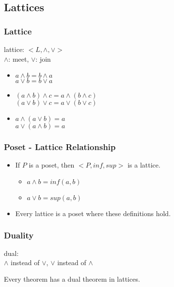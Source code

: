 \documentclass[dvipsnames]{beamer}
\begin{document}
\subsection{Lattices}

\begin{frame}
  \frametitle{Lattice}

  \begin{definition}
    \alert{lattice}: $<L,\wedge,\vee>$\\
    $\wedge$: meet, $\vee$: join

    \pause
    \begin{itemize}
      \item $a \wedge b = b \wedge a$\\
        $a \vee b = b \vee a$
      \item$(a \wedge b) \wedge c = a \wedge (b \wedge c)$\\
        $(a \vee b) \vee c = a \vee (b \vee c)$
      \item $a \wedge (a \vee b) = a$\\
        $a \vee (a \wedge b) = a$
    \end{itemize}
  \end{definition}
\end{frame}

\begin{frame}
  \frametitle{Poset - Lattice Relationship}

  \begin{itemize}
    \item If $P$ is a poset, then $<P,inf,sup>$ is a lattice.
    \begin{itemize}
      \item $a \wedge b = inf(a,b)$
      \item $a \vee b = sup(a,b)$
    \end{itemize}

    \pause
    \medskip
    \item Every lattice is a poset where these definitions hold.
  \end{itemize}
\end{frame}

\begin{frame}
  \frametitle{Duality}

  \begin{definition}
    \alert{dual}:\\
    $\wedge$ instead of $\vee$, $\vee$ instead of $\wedge$
  \end{definition}

  \pause
  \begin{theorem}
    Every theorem has a dual theorem in lattices.
  \end{theorem}
\end{frame}
\end{document}
